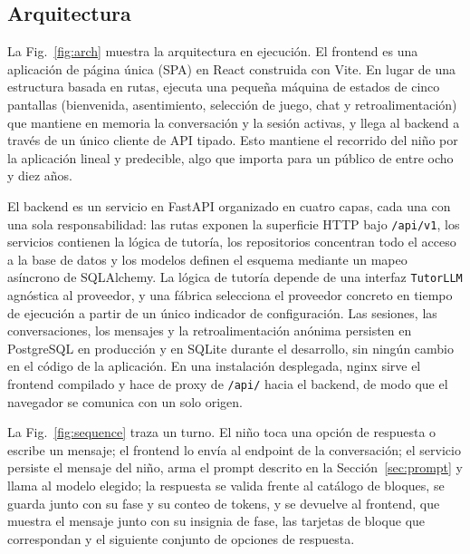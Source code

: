 \documentclass[conference]{IEEEtran}
\begin{document}
\subsection{Arquitectura}

La Fig.~\ref{fig:arch} muestra la arquitectura en ejecución. El frontend es una aplicación de página única (SPA) en React construida con Vite. En lugar de una estructura basada en rutas, ejecuta una pequeña máquina de estados de cinco pantallas (bienvenida, asentimiento, selección de juego, chat y retroalimentación) que mantiene en memoria la conversación y la sesión activas, y llega al backend a través de un único cliente de API tipado. Esto mantiene el recorrido del niño por la aplicación lineal y predecible, algo que importa para un público de entre ocho y diez años.

El backend es un servicio en FastAPI organizado en cuatro capas, cada una con una sola responsabilidad: las rutas exponen la superficie HTTP bajo \texttt{/api/v1}, los servicios contienen la lógica de tutoría, los repositorios concentran todo el acceso a la base de datos y los modelos definen el esquema mediante un mapeo asíncrono de SQLAlchemy. La lógica de tutoría depende de una interfaz \texttt{TutorLLM} agnóstica al proveedor, y una fábrica selecciona el proveedor concreto en tiempo de ejecución a partir de un único indicador de configuración. Las sesiones, las conversaciones, los mensajes y la retroalimentación anónima persisten en PostgreSQL en producción y en SQLite durante el desarrollo, sin ningún cambio en el código de la aplicación. En una instalación desplegada, nginx sirve el frontend compilado y hace de proxy de \texttt{/api/} hacia el backend, de modo que el navegador se comunica con un solo origen.

La Fig.~\ref{fig:sequence} traza un turno. El niño toca una opción de respuesta o escribe un mensaje; el frontend lo envía al endpoint de la conversación; el servicio persiste el mensaje del niño, arma el prompt descrito en la Sección~\ref{sec:prompt} y llama al modelo elegido; la respuesta se valida frente al catálogo de bloques, se guarda junto con su fase y su conteo de tokens, y se devuelve al frontend, que muestra el mensaje junto con su insignia de fase, las tarjetas de bloque que correspondan y el siguiente conjunto de opciones de respuesta.
\end{document}
